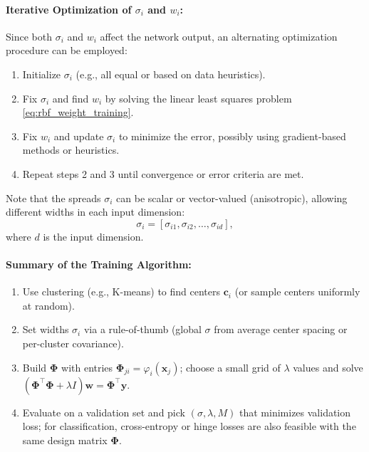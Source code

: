 \paragraph{Iterative Optimization of \(\sigma_i\) and \( w_i \):}
Since both \( \sigma_i \) and \( w_i \) affect the network output, an alternating optimization procedure can be employed:
\begin{enumerate}
    \item Initialize \( \sigma_i \) (e.g., all equal or based on data heuristics).
    \item Fix \( \sigma_i \) and find \( w_i \) by solving the linear least squares problem \eqref{eq:rbf_weight_training}.
    \item Fix \( w_i \) and update \( \sigma_i \) to minimize the error, possibly using gradient-based methods or heuristics.
    \item Repeat steps 2 and 3 until convergence or error criteria are met.
\end{enumerate}

Note that the spreads \( \sigma_i \) can be scalar or vector-valued (anisotropic), allowing different widths in each input dimension:
\[
\sigma_i = [\sigma_{i1}, \sigma_{i2}, \ldots, \sigma_{id}],
\]
where \( d \) is the input dimension.

\paragraph{Summary of the Training Algorithm:}
\begin{enumerate}
    \item Use clustering (e.g., K-means) to find centers \( \mathbf{c}_i \) (or sample centers uniformly at random).
    \item Set widths \(\sigma_i\) via a rule-of-thumb (global \(\sigma\) from average center spacing or per-cluster covariance).
    \item Build \(\boldsymbol{\Phi}\) with entries \(\boldsymbol{\Phi}_{ji}=\varphi_i(\mathbf{x}_j)\); choose a small grid of \(\lambda\) values and solve \((\boldsymbol{\Phi}^\top\boldsymbol{\Phi}+\lambda I)\mathbf{w}=\boldsymbol{\Phi}^\top\mathbf{y}\).
    \item Evaluate on a validation set and pick \((\sigma,\lambda, M)\) that minimizes validation loss; for classification, cross\hyp{}entropy or hinge losses are also feasible with the same design matrix \(\boldsymbol{\Phi}\).
\end{enumerate}

